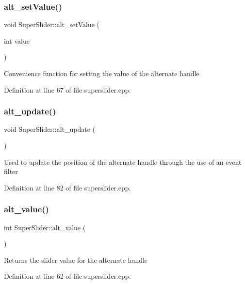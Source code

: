 \subsubsection{\texorpdfstring{alt\+\_\+set\+Value()}{alt\_setValue()}}
{\footnotesize\ttfamily void Super\+Slider\+::alt\+\_\+set\+Value (\begin{DoxyParamCaption}\item[{int}]{value }\end{DoxyParamCaption})}

Convenience function for setting the value of the alternate handle 

Definition at line 67 of file superslider.\+cpp.

\mbox{\label{class_super_slider_af8067e0fa6ea94d1b7e03fa377b5b1e7}} 
\subsubsection{\texorpdfstring{alt\+\_\+update()}{alt\_update()}}
{\footnotesize\ttfamily void Super\+Slider\+::alt\+\_\+update (\begin{DoxyParamCaption}{ }\end{DoxyParamCaption})}

Used to update the position of the alternate handle through the use of an event filter 

Definition at line 82 of file superslider.\+cpp.

\mbox{\label{class_super_slider_a3163146dc0b994d09b17ff2722ff4d9c}} 
\subsubsection{\texorpdfstring{alt\+\_\+value()}{alt\_value()}}
{\footnotesize\ttfamily int Super\+Slider\+::alt\+\_\+value (\begin{DoxyParamCaption}{ }\end{DoxyParamCaption})}

Returns the slider value for the alternate handle 

Definition at line 62 of file superslider.\+cpp.

